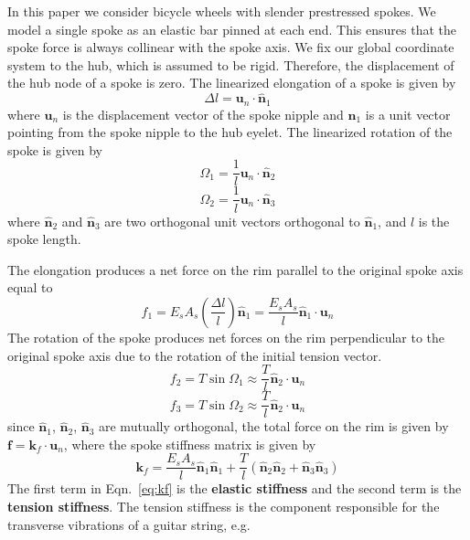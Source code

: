 \documentclass{bmd2016p}
\newcommand{\n}{\ensuremath{\hat{\bm{n}}_1}}
\newcommand{\nn}{\ensuremath{\hat{\bm{n}}_2}}
\newcommand{\nnn}{\ensuremath{\hat{\bm{n}}_3}}
\begin{document}
In this paper we consider bicycle wheels with slender prestressed spokes. We model a single spoke as an elastic bar pinned at each end. This ensures that the spoke force is always collinear with the spoke axis. We fix our global coordinate system to the hub, which is assumed to be rigid. Therefore, the displacement of the hub node of a spoke is zero. The linearized elongation of a spoke is given by
	\begin{equation}\label{eq:selong}
	\Delta l = \bm{u}_n\cdot \n
	\end{equation}
where $\bm{u}_n$ is the displacement vector of the spoke nipple and \n{} is a unit vector pointing from the spoke nipple to the hub eyelet. The linearized rotation of the spoke is given by
	\begin{equation}\label{eq:srot1}
	\Omega_1 = \frac{1}{l} \bm{u}_n\cdot \nn
	\end{equation}
	\begin{equation}\label{eq:srot2}
	\Omega_2 = \frac{1}{l} \bm{u}_n\cdot \nnn
	\end{equation}
where \nn{} and \nnn{} are two orthogonal unit vectors orthogonal to \n{}, and $l$ is the spoke length.

The elongation produces a net force on the rim parallel to the original spoke axis equal to
	\begin{equation}\label{eq:sF1}
	f_1 = E_sA_s\left(\frac{\Delta l}{l}\right)\n = \frac{E_sA_s}{l} \n \cdot \bm{u}_n 
	\end{equation}
The rotation of the spoke produces net forces on the rim perpendicular to the original spoke axis due to the rotation of the initial tension vector.
	\begin{equation}\label{eq:sF2}
	f_2 = T \sin{\Omega_1} \approx \frac{T}{l} \nn \cdot \bm{u}_n
	\end{equation}
	\begin{equation}\label{eq:sF3}
	f_3 = T \sin{\Omega_2} \approx \frac{T}{l} \nn \cdot \bm{u}_n
	\end{equation}
since \n{}, \nn{}, \nnn{} are mutually orthogonal, the total force on the rim is given by $\bm{f} = \bm{k}_f \cdot \bm{u}_n$, where the spoke stiffness matrix is given by
	\begin{equation}\label{eq:kf}
	\bm{k}_f = \frac{E_sA_s}{l}\n\n + \frac{T}{l}(\nn\nn + \nnn\nnn)
	\end{equation}
The first term in Eqn.~\ref{eq:kf} is the {\bf elastic stiffness} and the second term is the {\bf tension stiffness}. The tension stiffness is the component responsible for the transverse vibrations of a guitar string, e.g.
\end{document}

